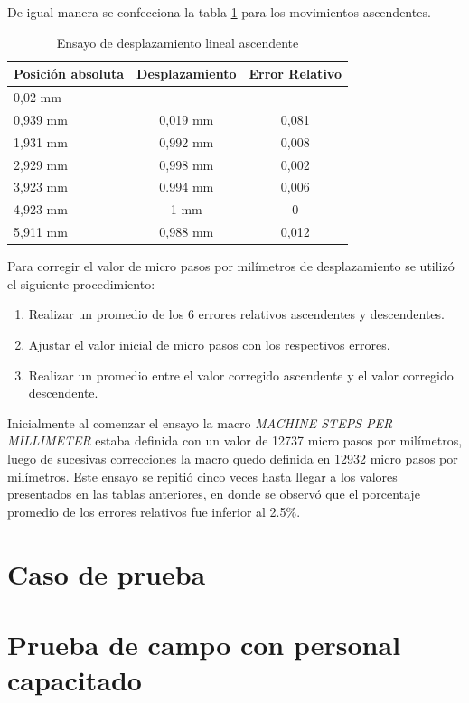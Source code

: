 De igual manera se confecciona la tabla \ref{tab:ensayo_desplazamiento_asc} para los movimientos ascendentes.
 
\begin{table}[h!]
	\centering
	\caption[Ensayo de desplazamiento]{Ensayo de desplazamiento lineal ascendente}
	\begin{tabular}{l c c }    
		\toprule
		\textbf{Posición absoluta}     & \textbf{Desplazamiento} & \textbf{Error Relativo} \\
		\midrule
		0,02 mm	& 	        	& 	 			 	\\		
		0,939 mm    & 	0,019 mm    	& 	0,081	\\
		1,931 mm 	& 	0,992 mm	    & 	0,008 	\\
		2,929 mm	& 	0,998 mm	    & 	0,002 	\\
		3,923 mm 	& 	0.994 mm        & 	0,006	\\
		4,923 mm 	& 	1 mm	    	& 	0		\\
		5,911 mm 	& 	0,988 mm        & 	0,012 	\\
		\bottomrule
		\hline
	\end{tabular}
	\label{tab:ensayo_desplazamiento_asc}
\end{table}


Para corregir el valor de micro pasos por milímetros de desplazamiento se utilizó el siguiente procedimiento:
\begin{enumerate}
\item Realizar un promedio de los 6 errores relativos ascendentes y descendentes.
\item Ajustar el valor inicial de micro pasos con los respectivos errores. 
\item Realizar un promedio entre el valor corregido ascendente y el valor corregido descendente.
\end{enumerate}


Inicialmente al comenzar el ensayo la macro \textit{MACHINE STEPS PER MILLIMETER}  estaba definida con un valor de 12737 micro pasos por milímetros, luego de sucesivas correcciones la macro quedo definida en 12932 micro pasos por milímetros.
Este ensayo se repitió cinco veces hasta llegar a los valores presentados en las tablas anteriores, en donde se observó que el porcentaje promedio de los errores relativos fue inferior al 2.5\%.

\section{Caso de prueba}
\section{Prueba de campo con personal capacitado}

